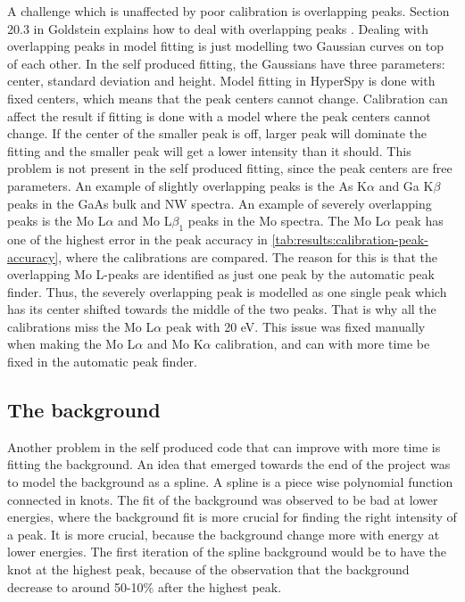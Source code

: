 A challenge which is unaffected by poor calibration is overlapping peaks.
Section 20.3 in Goldstein explains how to deal with overlapping peaks \cite{goldstein_scanning_2018}.
Dealing with overlapping peaks in model fitting is just modelling two Gaussian curves on top of each other.
In the self produced fitting, the Gaussians have three parameters: center, standard deviation and height.
Model fitting in HyperSpy is done with fixed centers, which means that the peak centers cannot change.
Calibration can affect the result if fitting is done with a model where the peak centers cannot change.
If the center of the smaller peak is off, larger peak will dominate the fitting and the smaller peak will get a lower intensity than it should.
This problem is not present in the self produced fitting, since the peak centers are free parameters.
An example of slightly overlapping peaks is the As K$\alpha$ and Ga K$\beta$ peaks in the GaAs bulk and NW spectra.
An example of severely overlapping peaks is the Mo L$\alpha$ and Mo L$\beta_1$ peaks in the Mo spectra.
The Mo L$\alpha$ peak has one of the highest error in the peak accuracy in \cref{tab:results:calibration-peak-accuracy}, where the calibrations are compared.
The reason for this is that the overlapping Mo L-peaks are identified as just one peak by the automatic peak finder.
Thus, the severely overlapping peak is modelled as one single peak which has its center shifted towards the middle of the two peaks.
That is why all the calibrations miss the Mo L$\alpha$ peak with 20 eV.
This issue was fixed manually when making the Mo L$\alpha$ and Mo K$\alpha$ calibration, and can with more time be fixed in the automatic peak finder.




























\subsection{The background}
\label{sec:discussion:general:background}
Another problem in the self produced code that can improve with more time is fitting the background.
An idea that emerged towards the end of the project was to model the background as a spline.
A spline is a piece wise polynomial function connected in knots.
The fit of the background was observed to be bad at lower energies, where the background fit is more crucial for finding the right intensity of a peak.
It is more crucial, because the background change more with energy at lower energies.
The first iteration of the spline background would be to have the knot at the highest peak, because of the observation that the background decrease to around 50-10\% after the highest peak.


